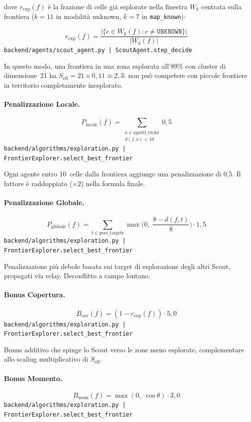 dove $r_{\text{exp}}(f)$ \`e la frazione di celle gi\`a esplorate nella finestra
$W_k$ centrata sulla frontiera ($k = 11$ in modalit\`a unknown, $k = 7$ in
\texttt{map\_known}):

$$r_{\text{exp}}(f) = \frac{|\{c \in W_k(f) : c \neq \texttt{UNKNOWN}\}|}{|W_k(f)|}$$
\noindent\hfill{\footnotesize\texttt{backend/agents/scout\_agent.py | ScoutAgent.step\_decide}}

In questo modo, una frontiera in una zona esplorata all'89\%
con cluster di dimensione~21 ha $S_{\text{eff}} = 21 \times 0{,}11 \approx 2{,}3$:
non pu\`o competere con piccole frontiere in territorio completamente inesplorato.

\paragraph{Penalizzazione Locale.}
$$P_{\text{locale}}(f) = \sum_{\substack{a \in \text{agenti\_vicini} \\ d(f, a) < 10}} 0{,}5$$
\noindent\hfill{\footnotesize\texttt{backend/algorithms/exploration.py | FrontierExplorer.select\_best\_frontier}}

Ogni agente entro 10~celle dalla frontiera aggiunge una penalizzazione di 0,5.
Il fattore \`e raddoppiato ($\times 2$) nella formula finale.

\paragraph{Penalizzazione Globale.}
$$P_{\text{globale}}(f) = \sum_{t \in \text{peer\_targets}} \max\!\Big(0,\; \frac{8 - d(f, t)}{8}\Big) \cdot 1{,}5$$
\noindent\hfill{\footnotesize\texttt{backend/algorithms/exploration.py | FrontierExplorer.select\_best\_frontier}}

Penalizzazione pi\`u debole basata sui target di esplorazione degli altri Scout,
propagati via relay. Deconflitto a campo lontano.

\paragraph{Bonus Copertura.}
$$B_{\text{cov}}(f) = (1 - r_{\text{exp}}(f)) \cdot 5{,}0$$
\noindent\hfill{\footnotesize\texttt{backend/algorithms/exploration.py | FrontierExplorer.select\_best\_frontier}}

Bonus additivo che spinge lo Scout verso le zone meno esplorate, complementare allo
scaling multiplicativo di $S_{\text{eff}}$.

\paragraph{Bonus Momento.}
$$B_{\text{mom}}(f) = \max(0,\; \cos\theta) \cdot 3{,}0$$
\noindent\hfill{\footnotesize\texttt{backend/algorithms/exploration.py | FrontierExplorer.select\_best\_frontier}}

